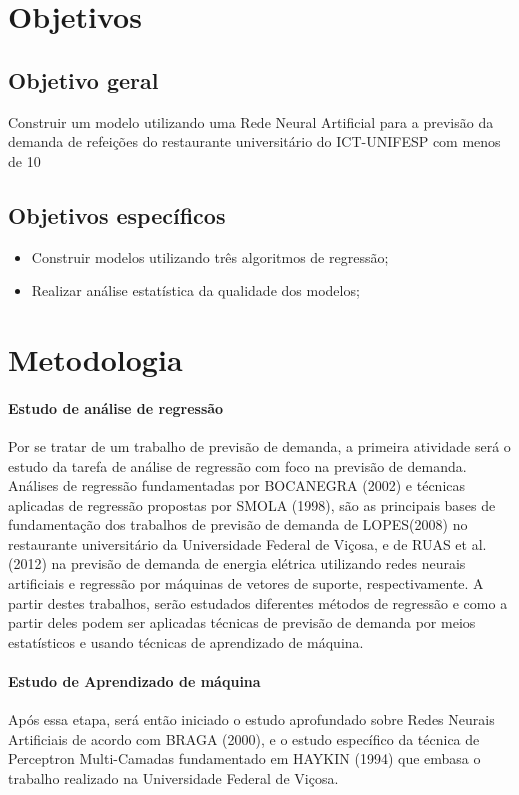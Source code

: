 \documentclass[	12pt, Times, openright, twoside, a4paper, english, brazil]{abntex2}
\begin{document}
\section{Objetivos}
\subsection{Objetivo geral}
Construir um modelo utilizando uma Rede Neural Artificial para a previsão da demanda de
refeições do restaurante universitário do ICT-UNIFESP com menos de 10%
\subsection{Objetivos específicos}
\begin{itemize}
\item Construir modelos utilizando três algoritmos de regressão; 
\item Realizar análise estatística da qualidade dos modelos;
\end{itemize}

\section{Metodologia}
\paragraph*{Estudo de análise de regressão} Por se tratar de um trabalho de previsão de demanda, a primeira atividade será o estudo da tarefa de análise de regressão com foco na previsão de demanda. Análises de regressão fundamentadas por BOCANEGRA (2002) e técnicas aplicadas de regressão propostas por SMOLA (1998), são as principais bases de fundamentação dos trabalhos de previsão de demanda de LOPES(2008) no restaurante universitário da Universidade Federal de Viçosa, e de RUAS et al. (2012) na previsão de demanda de energia elétrica utilizando redes neurais artificiais e regressão por máquinas de vetores de suporte, respectivamente. A partir destes trabalhos, serão estudados diferentes métodos de regressão e como a partir deles podem ser aplicadas técnicas de previsão de demanda por meios estatísticos e usando técnicas de aprendizado de máquina.

\paragraph*{Estudo de Aprendizado de máquina}
Após essa etapa, será então iniciado o estudo aprofundado sobre Redes Neurais Artificiais de acordo com BRAGA (2000), e o estudo específico da técnica de Perceptron Multi-Camadas fundamentado em HAYKIN (1994) que embasa o trabalho realizado na Universidade Federal de Viçosa.
\end{document}
